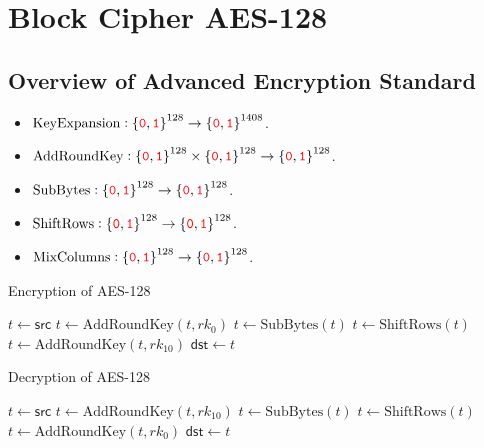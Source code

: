 \chapter{Block Cipher AES-128}

\section{Overview of Advanced Encryption Standard}

\begin{itemize}
	\item $\text{KeyExpansion}:\set{\textcolor{red}{\texttt{0}},\textcolor{red}{\texttt{1}}}^{128}\to\set{\textcolor{red}{\texttt{0}},\textcolor{red}{\texttt{1}}}^{1408}$.
	\item $\text{AddRoundKey}:\set{\textcolor{red}{\texttt{0}},\textcolor{red}{\texttt{1}}}^{128}\times\set{\textcolor{red}{\texttt{0}},\textcolor{red}{\texttt{1}}}^{128}\to\set{\textcolor{red}{\texttt{0}},\textcolor{red}{\texttt{1}}}^{128}$.
	\item $\text{SubBytes}:\set{\textcolor{red}{\texttt{0}},\textcolor{red}{\texttt{1}}}^{128}\to\set{\textcolor{red}{\texttt{0}},\textcolor{red}{\texttt{1}}}^{128}$.
	\item $\text{ShiftRows}:\set{\textcolor{red}{\texttt{0}},\textcolor{red}{\texttt{1}}}^{128}\to\set{\textcolor{red}{\texttt{0}},\textcolor{red}{\texttt{1}}}^{128}$.
	\item $\text{MixColumns}:\set{\textcolor{red}{\texttt{0}},\textcolor{red}{\texttt{1}}}^{128}\to\set{\textcolor{red}{\texttt{0}},\textcolor{red}{\texttt{1}}}^{128}$.
\end{itemize}

\begin{algorithm}[H]
	\caption{Encryption of AES-128}
	
	\BlankLine
	$t \leftarrow \mathsf{src}$\;
	$t \leftarrow \text{AddRoundKey}(t, rk_0)$\;
	$t \leftarrow \text{SubBytes}(t)$\;
	$t \leftarrow \text{ShiftRows}(t)$\;
	$t \leftarrow \text{AddRoundKey}(t, rk_{10})$\;
	$\mathsf{dst} \leftarrow t$\;
	\;
\end{algorithm}

\begin{algorithm}[H]
	\caption{Decryption of AES-128}
	
	\BlankLine
	$t \leftarrow \mathsf{src}$\;
	$t \leftarrow \text{AddRoundKey}(t, rk_{10})$\;
	$t \leftarrow \text{SubBytes}(t)$\;
	$t \leftarrow \text{ShiftRows}(t)$\;
	$t \leftarrow \text{AddRoundKey}(t, rk_{0})$\;
	$\mathsf{dst} \leftarrow t$\;
	\;
\end{algorithm}

